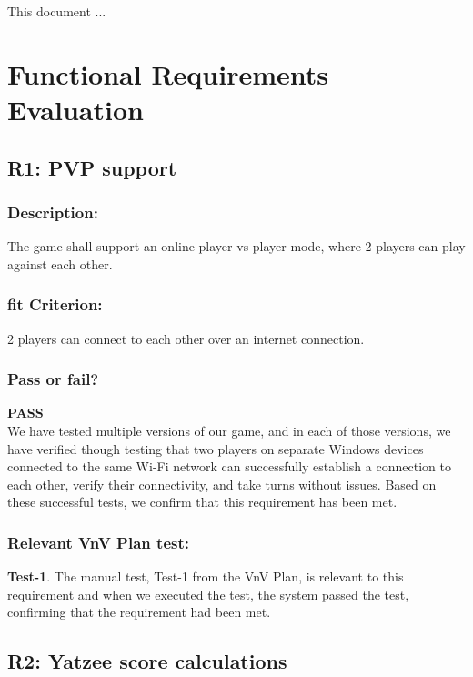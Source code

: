 \documentclass[12pt, titlepage]{article}
\begin{document}

This document ...

\section{Functional Requirements Evaluation}

\subsection{ R1: PVP support}

 \subsubsection{Description:}  The game shall support an online player vs player mode, where 2 players can play against
each other.

 \subsubsection{fit Criterion:}  2 players can connect to each other over an internet connection.
 
 \subsubsection{Pass or fail?}
 
 \noindent \textbf{PASS}\\
 
 \noindent  We have tested multiple versions of our game, and in each of those versions, we have verified though testing that two players on separate Windows devices connected to the same Wi-Fi network can successfully establish a connection to each other, verify their connectivity, and take turns without issues. Based on these successful tests, we confirm that this requirement has been met.
 
 \subsubsection{Relevant VnV Plan test: }  
 
  \noindent \textbf{ Test-1}. The manual test, Test-1 from the VnV Plan, is relevant to this requirement and when we executed the test, the system passed the test, confirming that the requirement had been met.

  
  \subsection{ R2: Yatzee score calculations} 
  
\end{document}
